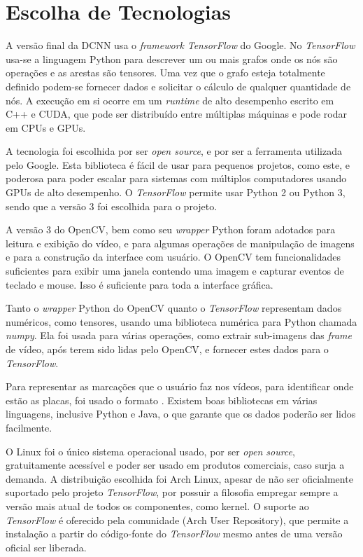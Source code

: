 \section{Escolha de Tecnologias}
A versão final da DCNN usa o \emph{framework} \emph{TensorFlow} do Google.
No \emph{TensorFlow} usa-se a linguagem Python para descrever um ou mais
grafos onde
os nós são operações e as arestas são tensores. Uma vez que o grafo esteja
totalmente definido podem-se fornecer dados e solicitar o cálculo de qualquer
quantidade de nós. A execução em si ocorre em um \emph{runtime} de alto
desempenho escrito em C++ e CUDA, que pode ser distribuído entre múltiplas
máquinas e pode rodar em CPUs e GPUs.

A tecnologia foi escolhida por ser \emph{open source}, e por ser a ferramenta
utilizada pelo Google. Esta biblioteca é fácil de usar para pequenos projetos,
como este, e poderosa para poder escalar para sistemas com múltiplos
computadores usando GPUs de alto desempenho. O \emph{TensorFlow} permite usar
Python 2 ou Python 3, sendo que a versão 3 foi escolhida para o projeto.

A versão 3 do OpenCV, bem como seu \emph{wrapper} Python foram adotados para
leitura e exibição do vídeo, e para algumas operações de manipulação de
imagens e para a construção da interface com usuário. O OpenCV tem
funcionalidades suficientes para exibir uma janela contendo
uma imagem e capturar eventos de teclado e mouse. Isso é suficiente para toda a
interface gráfica.

Tanto o \emph{wrapper} Python do OpenCV quanto o \emph{TensorFlow} representam
dados numéricos, como tensores, usando uma biblioteca numérica para
Python chamada \emph{numpy}. Ela foi usada para várias operações, como
extrair sub-imagens
das \emph{frame} de vídeo, após terem sido lidas pelo OpenCV, e fornecer
estes dados para o \emph{TensorFlow}.

Para representar as marcações que o usuário faz nos vídeos, para identificar
onde estão as placas, foi usado o formato .
Existem boas
bibliotecas em várias linguagens, inclusive Python e Java, o que garante que os
dados poderão ser lidos facilmente.

O Linux foi o único sistema operacional usado, por ser \emph{open source},
gratuitamente acessível e poder ser usado em produtos comerciais, caso surja a
demanda. A distribuição escolhida foi Arch Linux, apesar de não ser
oficialmente suportado pelo projeto \emph{TensorFlow}, por possuir a filosofia
empregar sempre a versão mais atual de todos os componentes, como kernel. O
suporte ao \emph{TensorFlow} é oferecido pela comunidade
 (Arch User Repository), que permite a instalação a partir do
código-fonte do \emph{TensorFlow} mesmo antes de uma versão oficial ser liberada.

